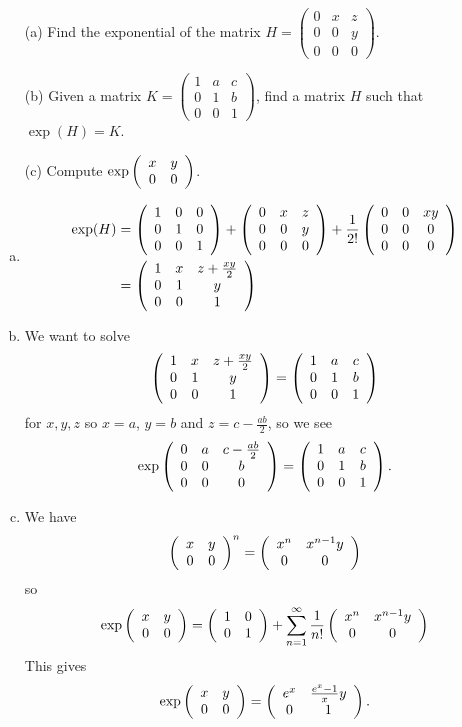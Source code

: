 \documentclass[12pt]{article}
\begin{document}
\begin{question}
\begin{enumerate}
\item[(a)] Find the exponential of the matrix $H=\left(\begin{array}{ccc}0 & x & z\\ 0 & 0 & y \\ 0 & 0 & 0\end{array}\right)$.
\item[(b)] Given a matrix $K=\left(\begin{array}{ccc}1 & a & c\\ 0 & 1 & b \\ 0 & 0 & 1\end{array}\right)$, find a matrix $H$ such that $\exp(H)=K$.
\item[(c)] Compute $\exp\matr{x}{y}{0}{0}$.
\end{enumerate}
\end{question}

\begin{answer}
\begin{enumerate}[(a)]
\item \begin{align*}
\exp(H)&=\matt{1}{0}{0}{0}{1}{0}{0}{0}{1}+\matt{0}{x}{z}{0}{0}{y}{0}{0}{0}+\frac{1}{2!}\matt{0}{0}{xy}{0}{0}{0}{0}{0}{0}\\
       &=\matt{1}{x}{z+\frac{xy}{2}}{0}{1}{y}{0}{0}{1}
\end{align*}
\item We want to solve
\[\matt{1}{x}{z+\frac{xy}{2}}{0}{1}{y}{0}{0}{1}=\matt{1}{a}{c}{0}{1}{b}{0}{0}{1}\]
for $x,y,z$ so $x=a$, $y=b$ and $z=c-\frac{ab}{2}$, so we see
\[\exp\matt{0}{a}{c-\frac{ab}{2}}{0}{0}{b}{0}{0}{0}=\matt{1}{a}{c}{0}{1}{b}{0}{0}{1}.\]
\item We have
\[\matr{x}{y}{0}{0}^n=\matr{x^n}{x^{n-1}y}{0}{0}\]
so
\[\exp\matr{x}{y}{0}{0}=\matr{1}{0}{0}{1}+\sum_{n=1}^{\infty}\frac{1}{n!}\matr{x^n}{x^{n-1}y}{0}{0}\]
This gives
\[\exp\matr{x}{y}{0}{0}=\matr{e^x}{\frac{e^x-1}{x}y}{0}{1}.\]
\end{enumerate}
\end{answer}
\newpage

\bigskip
\end{document}
